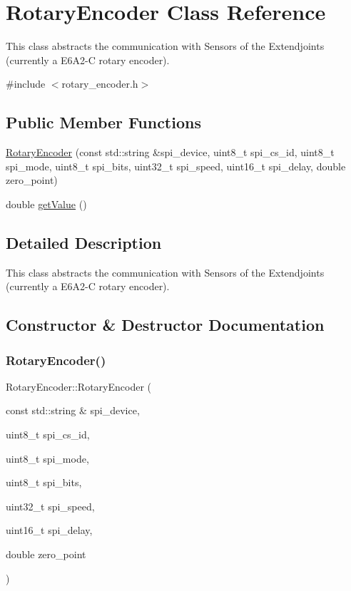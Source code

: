 \hypertarget{classRotaryEncoder}{}\section{Rotary\+Encoder Class Reference}
\label{classRotaryEncoder}


This class abstracts the communication with Sensors of the Extendjoints (currently a E6\+A2-\/C rotary encoder).  




{\ttfamily \#include $<$rotary\+\_\+encoder.\+h$>$}

\subsection*{Public Member Functions}
\begin{DoxyCompactItemize}
\item 
\hyperlink{classRotaryEncoder_a4a133815faa29f99d2a2e53b8568a411}{Rotary\+Encoder} (const std\+::string \&spi\+\_\+device, uint8\+\_\+t spi\+\_\+cs\+\_\+id, uint8\+\_\+t spi\+\_\+mode, uint8\+\_\+t spi\+\_\+bits, uint32\+\_\+t spi\+\_\+speed, uint16\+\_\+t spi\+\_\+delay, double zero\+\_\+point)
\item 
double \hyperlink{classRotaryEncoder_adf89df36f38d0ee87b454f22c25a85f0}{get\+Value} ()
\end{DoxyCompactItemize}


\subsection{Detailed Description}
This class abstracts the communication with Sensors of the Extendjoints (currently a E6\+A2-\/C rotary encoder). 

\subsection{Constructor \& Destructor Documentation}
\mbox{\label{classRotaryEncoder_a4a133815faa29f99d2a2e53b8568a411}} 
\subsubsection{\texorpdfstring{Rotary\+Encoder()}{RotaryEncoder()}}
{\footnotesize\ttfamily Rotary\+Encoder\+::\+Rotary\+Encoder (\begin{DoxyParamCaption}\item[{const std\+::string \&}]{spi\+\_\+device,  }\item[{uint8\+\_\+t}]{spi\+\_\+cs\+\_\+id,  }\item[{uint8\+\_\+t}]{spi\+\_\+mode,  }\item[{uint8\+\_\+t}]{spi\+\_\+bits,  }\item[{uint32\+\_\+t}]{spi\+\_\+speed,  }\item[{uint16\+\_\+t}]{spi\+\_\+delay,  }\item[{double}]{zero\+\_\+point }\end{DoxyParamCaption})}

